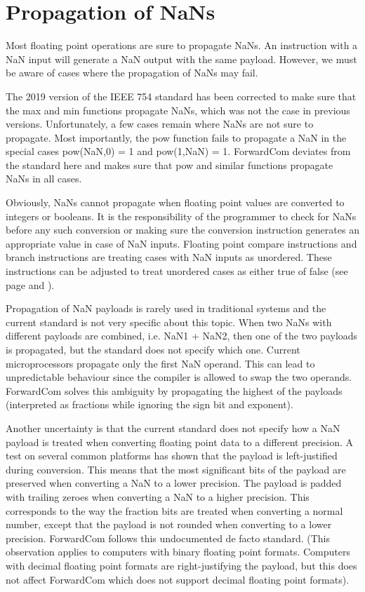 \documentclass[forwardcom.tex]{subfiles}
\begin{document}
\section{Propagation of NaNs}
\label{nanPropagation}

Most floating point operations are sure to propagate NaNs. An instruction with a NaN input will generate a NaN output with the same payload. However, we must be aware of cases where the propagation of NaNs may fail. 
\vv

The 2019 version of the IEEE 754 standard has been corrected to make sure that the max and min functions propagate NaNs, which was not the case in previous versions. Unfortunately, a few cases remain where NaNs are not sure to propagate. Most importantly, the pow function fails to propagate a NaN in the special cases pow(NaN,0) = 1 and pow(1,NaN) = 1. ForwardCom deviates from the standard here and makes sure that pow and similar functions propagate NaNs in all cases.
\vv

Obviously, NaNs cannot propagate when floating point values are converted to integers or booleans. It is the responsibility of the programmer to check for NaNs before any such conversion or making sure the conversion instruction generates an appropriate value in case of NaN inputs. Floating point compare instructions and branch instructions are treating cases with NaN inputs as unordered. These instructions can be adjusted to treat unordered cases as either true of false (see page \pageref{table:conditionCodesForCompareInstruction} and \pageref{table:floatCompareJumpInstructions}).
\vv

Propagation of NaN payloads is rarely used in traditional systems and the current standard is not very specific about this topic. When two NaNs with different payloads are combined, i.e. NaN1 + NaN2, then one of the two payloads is propagated, but the standard does not specify which one. Current microprocessors propagate only the first NaN operand. This can lead to unpredictable behaviour since the compiler is allowed to swap the two operands. ForwardCom solves this ambiguity by propagating the highest of the payloads (interpreted as fractions while ignoring the sign bit and exponent).
\vv

Another uncertainty is that the current standard does not specify how a NaN payload is treated when converting floating point data to a different precision. A test on several common platforms has shown that the payload is left-justified during conversion. This means that the most significant bits of the payload are preserved  when converting a NaN to a lower precision. The payload is padded with trailing zeroes when converting a NaN to a higher precision. This corresponds to the way the fraction bits are treated when converting a normal number, except that the payload is not rounded when converting to a lower precision. ForwardCom follows this undocumented de facto standard. (This observation applies to computers with binary floating point formats. Computers with decimal floating point formats are right-justifying the payload, but this does not affect ForwardCom which does not support decimal floating point formats).
\vv
\end{document}
